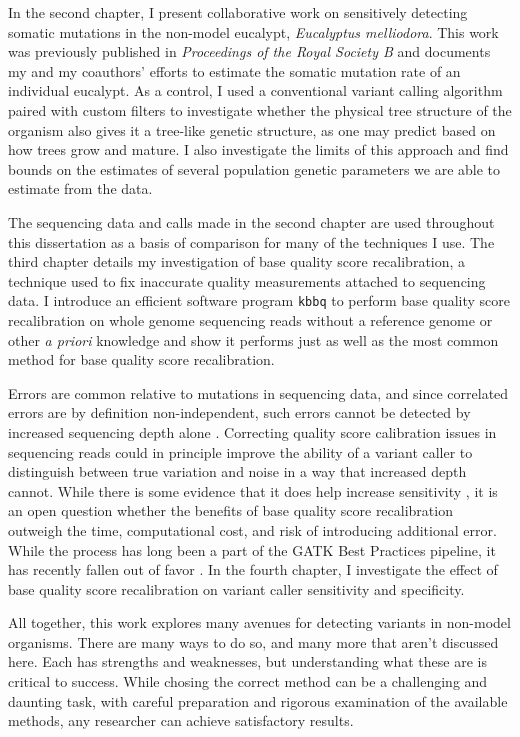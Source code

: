 In the second chapter, I present collaborative work on sensitively detecting somatic mutations in the non-model eucalypt, \textit{Eucalyptus melliodora}. This work was previously published in \textit{Proceedings of the Royal Society B} and documents my and my coauthors' efforts to estimate the somatic mutation rate of an individual eucalypt. As a control, I used a conventional variant calling algorithm paired with custom filters to investigate whether the physical tree structure of the organism also gives it a tree-like genetic structure, as one may predict based on how trees grow and mature. I also investigate the limits of this approach and find bounds on the estimates of several population genetic parameters we are able to estimate from the data.

The sequencing data and calls made in the second chapter are used throughout this dissertation as a basis of comparison for many of the techniques I use. The third chapter details my investigation of base quality score recalibration, a technique used to fix inaccurate quality measurements attached to sequencing data. I introduce an efficient software program \texttt{kbbq} to perform base quality score recalibration on whole genome sequencing reads without a reference genome or other \textit{a priori} knowledge and show it performs just as well as the most common method for base quality score recalibration.

Errors are common relative to mutations in sequencing data, \parencite{fox_accuracy_2014, wu_estimating_2017} and since correlated errors are by definition non-independent, such errors cannot be detected by increased sequencing depth alone \parencite{meacham_identification_2011, taub_overcoming_2010}. Correcting quality score calibration issues in sequencing reads could in principle improve the ability of a variant caller to distinguish between true variation and noise in a way that increased depth cannot. While there is some evidence that it does help increase sensitivity \parencite{ni_improvement_2016}, it is an open question whether the benefits of base quality score recalibration outweigh the time, computational cost, and risk of introducing additional error. While the process has long been a part of the GATK Best Practices pipeline, it has recently fallen out of favor \parencite{van_der_auwera_geraldine_2020_b}. In the fourth chapter, I investigate the effect of base quality score recalibration on variant caller sensitivity and specificity.

All together, this work explores many avenues for detecting variants in non-model organisms. 
There are many ways to do so, and many more that aren't discussed here.
Each has strengths and weaknesses, but understanding what these are is critical to success.
While chosing the correct method can be a challenging and daunting task, with careful preparation and rigorous examination of the available methods, any researcher can achieve satisfactory results.

\printbibliography[segment=\therefsegment]{}
